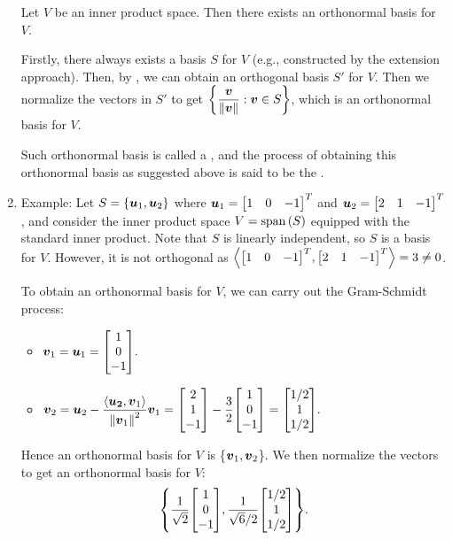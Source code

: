 \begin{enumerate}
\begin{corollary}
\label{cor:exist-orthonormal-basis}
Let \(V\) be an inner product space. Then there exists an orthonormal basis for
\(V\).
\end{corollary}
\begin{pf}
Firstly, there always exists a basis \(S\) for \(V\) (e.g., constructed by the
extension approach). Then, by , we can obtain
an orthogonal basis \(S'\) for \(V\). Then we normalize the vectors in \(S'\)
to get \(\displaystyle \qty{\frac{\vb*{v}}{\norm{\vb*{v}}}:\vb*{v}\in S}\),
which is an orthonormal basis for \(V\).

\begin{note}
Such orthonormal basis is called a , and
the process of obtaining this orthonormal basis as suggested above is said to
be the .
\end{note}
\end{pf}

\item Example: Let \(S=\{\vb*{u}_1,\vb*{u}_2\}\) where
\(\vect{u}_1=\mqty[1&0&-1]^{T}\) and \(\vect{u}_2=\mqty[2&1&-1]^{T}\), and
consider the inner product space \(V=\operatorname{span}\qty(S)\) equipped with the standard inner
product. Note that \(S\) is linearly independent, so \(S\) is a basis for
\(V\). However, it is not orthogonal as
\(\inner{\mqty[1&0&-1]^{T}}{\mqty[2&1&-1]^{T}}=3\ne 0\).

To obtain an orthonormal basis for \(V\), we can carry out the Gram-Schmidt
process:
\begin{itemize}
\item \(\displaystyle \vect{v}_1=\vect{u}_1=\mqty[1\\ 0\\ -1].\) 
\item \(\displaystyle
\vect{v}_2=\vect{u}_2-\frac{\inner{\vect{\vect{u}_2}}{\vect{v}_1}}{\norm{\vect{v}_1}^{2}}\vect{v}_1
=\mqty[2\\ 1\\ -1]-\frac{3}{2}\mqty[1\\ 0\\ -1]
=\mqty[1/2\\ 1\\ 1/2].
\)
 \end{itemize}
Hence an orthonormal basis for \(V\) is \{\(\vb*{v}_1,\vb*{v}_2\)\}. We then
normalize the vectors to get an orthonormal basis for \(V\):
\[
\qty{\frac{1}{\sqrt{2}}\mqty[1\\ 0\\ -1],
\frac{1}{\sqrt{6}/2}\mqty[1/2\\ 1\\ 1/2]
}.
\]
\end{enumerate}
